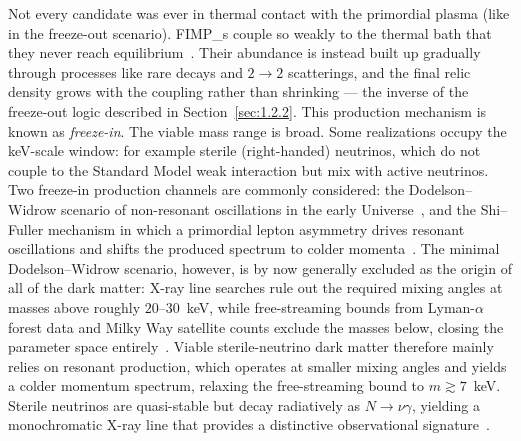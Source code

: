 Not every candidate was ever in thermal contact with the primordial plasma (like in the freeze-out scenario).
\Glspl{FIMP_} couple so weakly to the thermal bath that they never reach equilibrium~\cite{Hall:2009bx}.
Their abundance is instead built up gradually through processes like rare decays and $2 \to 2$ scatterings, and the final relic density grows with the coupling rather than shrinking --- the inverse of the freeze-out logic described in Section~\ref{sec:1.2.2}.
This production mechanism is known as \emph{freeze-in}.
The viable \FIMP mass range is broad. Some realizations occupy the keV-scale window: for example sterile (right-handed) neutrinos, which do not couple to the Standard Model weak interaction but mix with active neutrinos.
Two freeze-in production channels are commonly considered: the Dodelson--Widrow scenario of non-resonant oscillations in the early Universe~\cite{Dodelson:1993je}, and the Shi--Fuller mechanism in which a primordial lepton asymmetry drives resonant oscillations and shifts the produced spectrum to colder momenta~\cite{Shi:1998km}.
The minimal Dodelson--Widrow scenario, however, is by now generally excluded as the origin of all of the dark matter: X-ray line searches rule out the required mixing angles at masses above roughly $20$--$30$~keV, while free-streaming bounds from Lyman-$\alpha$ forest data and Milky Way satellite counts exclude the masses below, closing the parameter space entirely~\cite{Boyarsky:2018tvu}.
Viable sterile-neutrino dark matter therefore mainly relies on resonant production, which operates at smaller mixing angles and yields a colder momentum spectrum, relaxing the free-streaming bound to $m \gtrsim 7$~keV.
Sterile neutrinos are quasi-stable but decay radiatively as $N \to \nu\gamma$, yielding a monochromatic X-ray line that provides a distinctive observational signature~\cite{Boyarsky:2018tvu,Drewes:2016upu}.



